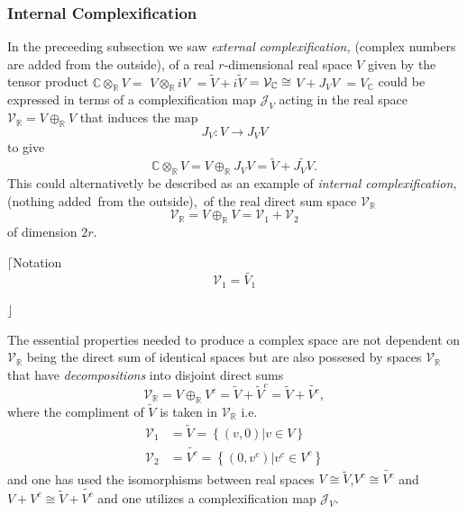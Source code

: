 \documentclass[aps,preprint]{revtex4}
\begin{document}
\subsubsection{Internal Complexification}

In the preceeding subsection we saw \emph{external} \emph{complexification,}
(complex numbers are added from the outside), of a real $r$-dimensional real
space $V$ given by the tensor product $\mathbb{C}\otimes_{\mathbb{R}}V=$ $%
V\otimes_{\mathbb{R}}iV$ $=\widetilde{V}+i\widetilde{V}$ $=\mathcal{V}_{%
\mathbb{C}}\cong$ $V+J_{V}V$ $=V_{\mathbb{C}}$ could be expressed in terms
of a complexification map $\mathcal{J}_{V}$ acting in the real space $%
\mathcal{V}_{\mathbb{R}}=V\oplus_{\mathbb{R}}V$ that induces the map 
\begin{equation}
J_{V}:V\rightarrow J_{V}V
\end{equation}
to give 
\begin{equation}
\mathbb{C}\otimes_{\mathbb{R}}V=V\oplus_{\mathbb{R}}J_{V}V=\widetilde{V}+%
\widetilde{J_{V}V}.
\end{equation}
This could alternativetly be described as an example of \emph{internal
complexification, }(nothing added\emph{\ }from the outside),\emph{\ }of the
real direct sum space $\mathcal{V}_{\mathbb{R}}$ 
\begin{equation}
\mathcal{V}_{\mathbb{R}}=V\oplus_{\mathbb{R}}V=\mathcal{V}_{1}+\mathcal{V}%
_{2}
\end{equation}
of dimension $2r.$

$\lceil$Notation 
\begin{equation}
\mathcal{V}_{1}=\widetilde{V_{1}}
\end{equation}

$\rfloor$

The essential properties needed to produce a complex space are not dependent
on $\mathcal{V}_{\mathbb{R}}$ being the direct sum of identical spaces but
are also possesed by spaces $\mathcal{V}_{\mathbb{R}}$ that have \emph{%
decompositions} into disjoint direct sums 
\begin{equation}
\mathcal{V}_{\mathbb{R}}=V\oplus_{\mathbb{R}}V^{c}=\widetilde{V}+\widetilde{V%
}^{c}=\widetilde{V}+\widetilde{V^{c}},
\end{equation}
where the compliment of $\widetilde{V}$ is taken in $\mathcal{V}_{\mathbb{R}%
} $ i.e. 
\begin{align}
\mathcal{V}_{1} & =\widetilde{V}=\left\{ \left. \left( v,0\right)
\right\vert v\in V\right\} \\
\mathcal{V}_{2} & =\widetilde{V^{c}}=\left\{ \left. \left( 0,v^{c}\right)
\right\vert v^{c}\in V^{c}\right\}
\end{align}
and one has used the isomorphisms between real spaces $V\cong\widetilde{V}$,$%
V^{c}\cong\widetilde{V^{c}}$ and $V+V^{c}\cong\widetilde{V}+\widetilde{V^{c}}
$ and one utilizes a complexification map $\mathcal{J}_{V}.$
\end{document}
